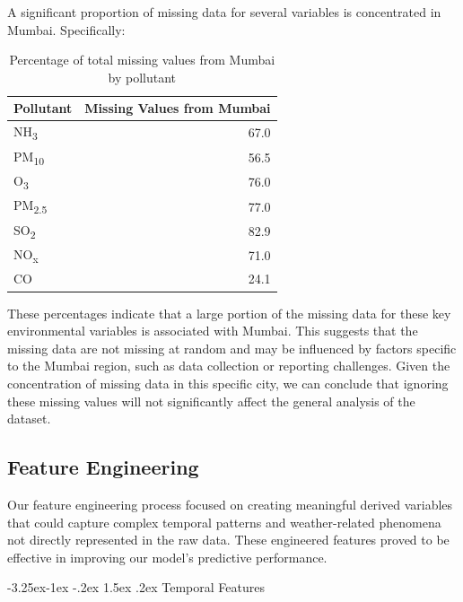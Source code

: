 \documentclass[twoside,11pt]{article}
\makeatletter
\renewcommand\subsubsection{\@startsection{subsubsection}{3}{\z@}%
  {-3.25ex\@plus -1ex \@minus -.2ex}%
  {1.5ex \@plus .2ex}%
  {\normalfont\bfseries\normalsize}}
\makeatother
\begin{document}
A significant proportion of missing data for several variables is concentrated in Mumbai. Specifically:
\begin{table}[ht]
  \centering
  \begin{tabular}{lr}
  \hline
  Pollutant & Missing Values from Mumbai \\
  \hline
  NH\textsubscript{3} & 67.0 \\
  PM\textsubscript{10} & 56.5 \\
  O\textsubscript{3} & 76.0 \\
  PM\textsubscript{2.5} & 77.0 \\
  SO\textsubscript{2} & 82.9 \\
  NO\textsubscript{x} & 71.0 \\
  CO & 24.1 \\
  \hline
  \end{tabular}
  \caption{Percentage of total missing values from Mumbai by pollutant}
  \label{tab:mumbai_missing}
  \end{table}


These percentages indicate that a large portion of the missing data for these key environmental variables is associated with Mumbai. This suggests that the missing data are not missing at random and may be influenced by factors specific to the Mumbai region, such as data collection or reporting challenges. Given the concentration of missing data in this specific city, we can conclude that ignoring these missing values will not significantly affect the general analysis of the dataset.

\subsection{Feature Engineering}

Our feature engineering process focused on creating meaningful derived variables that could capture complex temporal patterns and weather-related phenomena not directly represented in the raw data. These engineered features proved to be effective in improving our model's predictive performance.

\subsubsection{Temporal Features}
\end{document}
